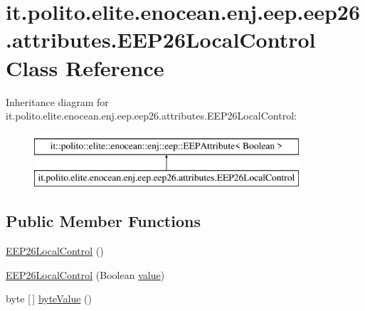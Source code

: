 \hypertarget{classit_1_1polito_1_1elite_1_1enocean_1_1enj_1_1eep_1_1eep26_1_1attributes_1_1_e_e_p26_local_control}{}\section{it.\+polito.\+elite.\+enocean.\+enj.\+eep.\+eep26.\+attributes.\+E\+E\+P26\+Local\+Control Class Reference}
\label{classit_1_1polito_1_1elite_1_1enocean_1_1enj_1_1eep_1_1eep26_1_1attributes_1_1_e_e_p26_local_control}
Inheritance diagram for it.\+polito.\+elite.\+enocean.\+enj.\+eep.\+eep26.\+attributes.\+E\+E\+P26\+Local\+Control\+:\begin{figure}[H]
\begin{center}
\leavevmode
\includegraphics[height=2.000000cm]{classit_1_1polito_1_1elite_1_1enocean_1_1enj_1_1eep_1_1eep26_1_1attributes_1_1_e_e_p26_local_control}
\end{center}
\end{figure}
\subsection*{Public Member Functions}
\begin{DoxyCompactItemize}
\item 
\hyperlink{classit_1_1polito_1_1elite_1_1enocean_1_1enj_1_1eep_1_1eep26_1_1attributes_1_1_e_e_p26_local_control_a8332d923ca708c6ef0e4a6226fb9b523}{E\+E\+P26\+Local\+Control} ()
\item 
\hyperlink{classit_1_1polito_1_1elite_1_1enocean_1_1enj_1_1eep_1_1eep26_1_1attributes_1_1_e_e_p26_local_control_a50f0957ecb3e0569ee5791e6df70b32b}{E\+E\+P26\+Local\+Control} (Boolean \hyperlink{classit_1_1polito_1_1elite_1_1enocean_1_1enj_1_1eep_1_1_e_e_p_attribute_af4d7e34642004bb6ccfae51e925c983d}{value})
\item 
byte \mbox{[}$\,$\mbox{]} \hyperlink{classit_1_1polito_1_1elite_1_1enocean_1_1enj_1_1eep_1_1eep26_1_1attributes_1_1_e_e_p26_local_control_a099c71b4a130cb477324f1200603e1de}{byte\+Value} ()
\end{DoxyCompactItemize}
